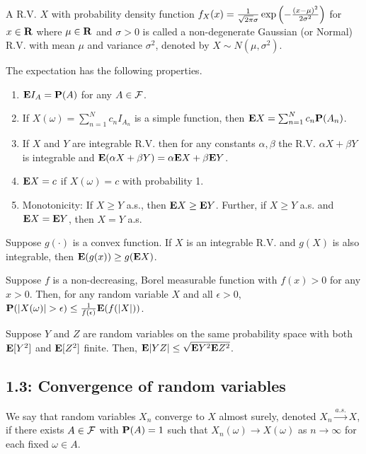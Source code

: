\begin{definition*} 
A R.V. $X$ with probability density function $f_X(x) = \frac{1}{\sqrt{2\pi}
\sigma} \exp\left(  - \frac{(x - \mu)^2}{2\sigma^2} \right)$ for $x \in \mathbf{R}$ where $\mu
\in \mathbf{R}$ and $\sigma > 0$ is called a non-degenerate Gaussian (or Normal) R.V.
with mean $\mu$ and variance $\sigma^2$, denoted by $X \sim N(\mu, \sigma^2)$.
\end{definition*} 

\begin{proposition*} 
The expectation has the following properties.
\begin{enumerate}
\item $\mathbf{E} I_A = \mathbf{P}(A)$ for any $A \in \mathcal{F}$.
\item If $X(\omega) = \sum_{n=1}^N c_n I_{A_n}$ is a simple function, then
$\mathbf{E} X = \sum_{n=1}^N c_n \mathbf{P}(A_n)$.
\item If $X$ and $Y$ are integrable R.V. then for any constants $\alpha, \beta$
the R.V. $\alpha X + \beta Y$ is integrable and $\mathbf{E}(\alpha X + \beta Y) = \alpha
\mathbf{E} X + \beta \mathbf{E} Y$.
\item $\mathbf{E} X = c$ if $X(\omega) = c$ with probability 1.
\item Monotonicity: If $X \ge Y$ a.s., then $\mathbf{E} X \ge \mathbf{E} Y$. Further, if $X \ge
Y$ a.s. and $\mathbf{E} X = \mathbf{E} Y$, then $X = Y$ a.s.
\end{enumerate}
\end{proposition*} 

\begin{proposition*}
Suppose $g(\cdot)$ is a convex function. If $X$ is an integrable R.V. and $g(X)$
is also integrable, then $\mathbf{E}(g(x)) \ge g(\mathbf{E} X)$.
\end{proposition*} 

\begin{theorem*}
Suppose $f$ is a non-decreasing, Borel measurable function with $f(x) > 0$ for
any $x > 0$. Then, for any random variable $X$ and all $\epsilon > 0$,
$\mathbf{P}(|X(\omega)| > \epsilon) \le \frac{1}{f(\epsilon)} \mathbf{E}(f(|X|))$.
\end{theorem*} 

\begin{proposition*} 
Suppose $Y$ and $Z$ are random variables on the same probability space with both
$\mathbf{E}[Y^2]$ and $\mathbf{E}[Z^2]$ finite. Then, $\mathbf{E}|YZ| \le \sqrt{\mathbf{E} Y^2 \mathbf{E} Z^2}$.
\end{proposition*} 

\subsection*{1.3: Convergence of random variables}
\begin{definition*} 
We say that random variables $X_n$ converge to $X$ almost surely, denoted
$X_n \xrightarrow{a.s.} X$, if there exists $A \in \mathcal{F}$ with $\mathbf{P}(A) = 1$ such
that $X_n(\omega) \rightarrow X(\omega)$ as $n \rightarrow \infty$ for each
fixed $\omega \in A$.
\end{definition*} 

